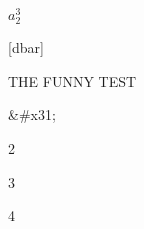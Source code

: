 \documentclass{article}
\begin{document}


\begin{foo}
   $ a_2^3 $  
\end{foo}
\tracingall

\makeatletter
{}
[dbar]{}
\makeatother

\def\Foo#1{seen #1 in Foo}
\def\Bar#1{seen #1 in Bar}



THE FUNNY TEST
 
\def\ok{4} \leavevmode
\begin{rawxml}
&#x31;
\end{rawxml}
\begin{latexonly}\def\ok{2}\ok\end{latexonly}
\begin{htmlonly}
\def\ok{ ?
\end{htmlonly}
\begin{comment}
\def\ok{ ?
\end{comment}
\begin{rawhtml}
<p>\def\ok{ ?</p>
\end{rawhtml}
\begin{LaTeXonly}
\def\ok{ ?
\end{LaTeXonly}
\begin{xmlonly}\def\ok{3}\ok\end{xmlonly}
\ok
\end{document}
